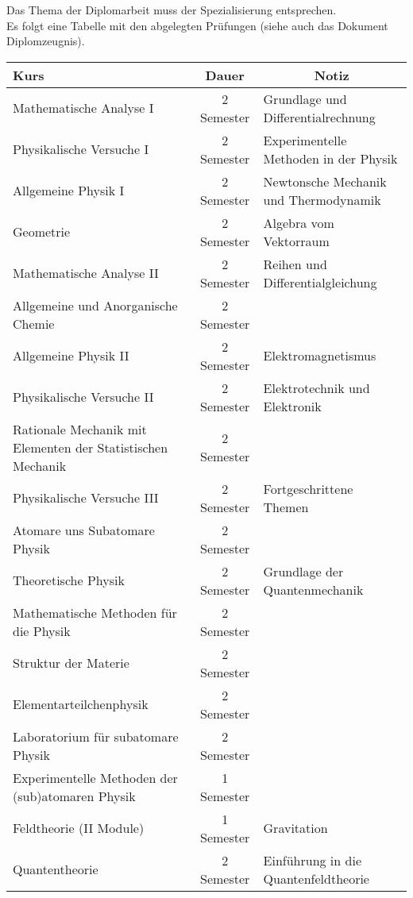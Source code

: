 \documentclass[a4paper,11pt]{article}
\begin{document}
Das Thema der Diplomarbeit muss der Spezialisierung entsprechen.\\

Es folgt eine Tabelle mit den abgelegten Pr\"ufungen (siehe auch das Dokument
Diplomzeugnis).

\newpage

\begin{table}[hbt]
\centering
\begin{tabular}{p{5cm}cl}
\toprule
\textbf{Kurs} & \textbf{Dauer}                      &
\multicolumn{1}{c}{\textbf{Notiz}}
\\
\midrule
Mathematische Analyse I  & 2 Semester & Grundlage und
Differentialrechnung \\
Physikalische Versuche I & 2 Semester            & Experimentelle
Methoden in der Physik\\
Allgemeine Physik I     &  2 Semester           &   Newtonsche
Mechanik und Thermodynamik        \\
Geometrie       & 2 Semester           &   Algebra vom
Vektorraum \\
\midrule
Mathematische Analyse II  & 2 Semester & Reihen und Differentialgleichung \\
Allgemeine und Anorganische Chemie & 2 Semester & \\
Allgemeine Physik II & 2 Semester &  Elektromagnetismus\\
Physikalische Versuche II & 2 Semester & Elektrotechnik und Elektronik \\
Rationale Mechanik mit Elementen der Statistischen Mechanik & 2 Semester & \\
\midrule
Physikalische Versuche III & 2 Semester & Fortgeschrittene Themen\\
Atomare uns Subatomare Physik & 2 Semester & \\
Theoretische Physik & 2 Semester & Grundlage der Quantenmechanik\\
Mathematische Methoden f\"ur die Physik & 2 Semester &\\
Struktur der Materie & 2 Semester &\\
\midrule
Elementarteilchenphysik & 2 Semester & \\
Laboratorium f\"ur subatomare Physik & 2 Semester &\\
Experimentelle Methoden der (sub)atomaren Physik & 1 Semester & \\
Feldtheorie (II Module) & 1 Semester & Gravitation\\
Quantentheorie & 2 Semester & Einf\"uhrung in die Quantenfeldtheorie\\
\bottomrule
\end{tabular}
\end{table}
\end{document}
